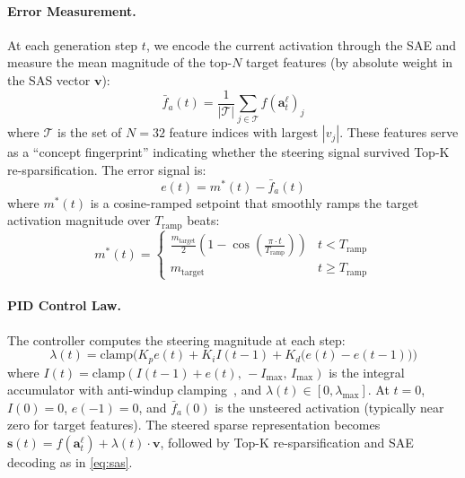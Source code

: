 \documentclass{article}
\theoremstyle{plain}
\begin{document}
\paragraph{Error Measurement.}
At each generation step $t$, we encode the current activation through the SAE and measure the mean magnitude of the top-$N$ target features (by absolute weight in the SAS vector $\mathbf{v}$):
\begin{equation}
    \bar{f}_a(t) = \frac{1}{|\mathcal{T}|} \sum_{j \in \mathcal{T}} f(\mathbf{a}_t^\ell)_j
    \label{eq:measure}
\end{equation}
where $\mathcal{T}$ is the set of $N{=}32$ feature indices with largest $|v_j|$. These features serve as a ``concept fingerprint'' indicating whether the steering signal survived Top-K re-sparsification. The error signal is:
\begin{equation}
    e(t) = m^*(t) - \bar{f}_a(t)
    \label{eq:error}
\end{equation}
where $m^*(t)$ is a cosine-ramped setpoint that smoothly ramps the target activation magnitude over $T_\text{ramp}$ beats:
\begin{equation}
    m^*(t) = \begin{cases}
        \frac{m_\text{target}}{2}\left(1 - \cos\!\left(\frac{\pi \cdot t}{T_\text{ramp}}\right)\right) & t < T_\text{ramp} \\[4pt]
        m_\text{target} & t \geq T_\text{ramp}
    \end{cases}
    \label{eq:setpoint}
\end{equation}

\paragraph{PID Control Law.}
The controller computes the steering magnitude at each step:
\begin{equation}
    \lambda(t) = \text{clamp}\!\Big(K_p e(t) + K_i I(t{-}1) + K_d \big(e(t) - e(t{-}1)\big)\Big)
    \label{eq:pid_temporal}
\end{equation}
where $I(t) = \text{clamp}(I(t{-}1) + e(t),\, {-}I_\text{max},\, I_\text{max})$ is the integral accumulator with anti-windup clamping~\cite{astrom1995pid}, and $\lambda(t) \in [0, \lambda_\text{max}]$. At $t{=}0$, $I(0){=}0$, $e(-1){=}0$, and $\bar{f}_a(0)$ is the unsteered activation (typically near zero for target features). The steered sparse representation becomes $\mathbf{s}(t) = f(\mathbf{a}_t^\ell) + \lambda(t) \cdot \mathbf{v}$, followed by Top-K re-sparsification and SAE decoding as in \cref{eq:sas}.
\end{document}
